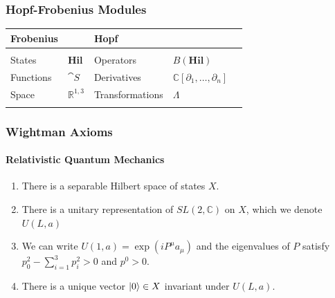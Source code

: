 \documentclass{beamer}
\begin{document}



\begin{frame}


\frametitle{Hopf-Frobenius Modules}
%

\begin{tabularx}{\textwidth}{ll|ll>{\raggedright\arraybackslash}X}
\toprule
Frobenius & & Hopf
\\
\midrule
& & \\
States & \textbf{Hil} & Operators & $B(\textbf{Hil})$ \\
Functions & $\cat{S}$ & Derivatives & $\mathbb{C}[\partial_1, \ldots, \partial_n]$ \\
Space & $\mathbb{R}^{1,3}$ & Transformations & $\Lambda$
\\
&& \\
\bottomrule
\end{tabularx}



\end{frame}







\begin{frame}
\frametitle{Wightman Axioms}
\framesubtitle{Relativistic Quantum Mechanics}


\begin{enumerate}
\item {} There is a separable Hilbert space of states $X$.

\item {} There is a unitary representation of $SL(2, \mathbb{C})$ on $X$, which we denote $U(L,a)$

\item {} We can write $U(1,a) = \exp(i P^{\mu} a_\mu)$ and the eigenvalues of $P$ satisfy $p_0^2 - \sum_{i=1}^3 p_i^2 > 0$ and $p^0 > 0$.

\item {} There is a unique vector $\ket{0} \in X$ invariant under $U(L,a)$.
\end{enumerate}


\end{frame}





\end{document}
